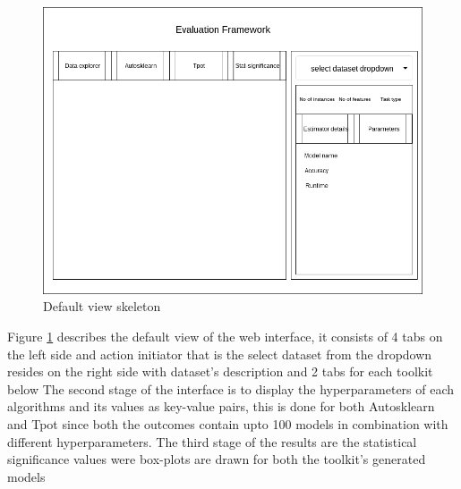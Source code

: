 \begin{figure}[!h]
    	\centering
    	\includegraphics[width=0.8\linewidth]{thesis_template/images/Default_skeleton.png}
    	\caption{Default view skeleton}
    	\label{fig:default_skeleton}
        \end{figure}

Figure \ref{fig:default_skeleton} describes the default view of the web interface, it consists of 4 tabs on the left side and action initiator that is the select dataset from the dropdown resides on the right side with dataset's description and 2 tabs for each toolkit below
The second stage of the interface is to display the hyperparameters of each algorithms and its values as key-value pairs, this is done for both Autosklearn and Tpot since both the outcomes contain upto 100 models in combination with different hyperparameters. The third stage of the results are the statistical significance values were box-plots are drawn for both the toolkit's generated models




